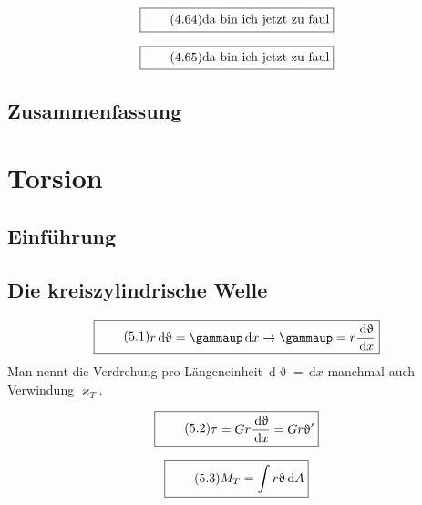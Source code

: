 \documentclass[11pt]{article}
\newcommand{\1}{ {\mathds{1}} }
\newcommand{\td}{\,\text{d}}
\renewcommand{\theta  }{\upvartheta}
\renewcommand{\gamma  }{\gammaup   }
\begin{document}
		\begin{equation}
			\boxed{
				\tag{4.64}
				\begin{split}
					\text{da bin ich jetzt zu faul}
				\end{split}
			}
		\end{equation}

		\begin{equation}
			\boxed{
				\tag{4.65}
				\begin{split}
					\text{da bin ich jetzt zu faul}
				\end{split}
			}
		\end{equation}

		\subsection{Zusammenfassung}
	
		\section{Torsion}
		\subsection{Einführung}
		\subsection{Die kreiszylindrische Welle}

		\begin{equation}
			\boxed{
				\tag{5.1}
				\begin{split}
					r\td \theta = \gamma \td x \rightarrow \gamma = r\frac{\td \theta}{\td x}
				\end{split}
			}
		\end{equation}
		Man nennt die Verdrehung pro Längeneinheit $ \td\theta = \td x $ manchmal auch Verwindung $\varkappa_T$.
		
		\begin{equation}
			\boxed{
				\tag{5.2}
				\begin{split}
					\tau = G r \frac{\td \theta}{\td x} = G r \theta'
				\end{split}
			}
		\end{equation}

		\begin{equation}
			\boxed{
				\tag{5.3}
				\begin{split}
					M_T = \int r\theta \td A
				\end{split}
			}
		\end{equation}
\end{document}
